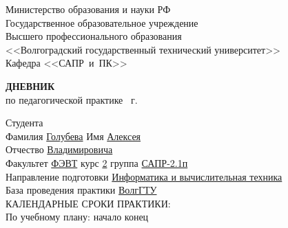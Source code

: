 \documentclass[a4paper, 14pt]{extreport}
\begin{document}
    \begin{titlepage}
        \begin{center}
            Министерство образования и науки РФ \\
            Государственное образовательное учреждение\\
            Высшего профессионального образования\\
            <<Волгоградский государственный технический университет>>\\
            Кафедра <<САПР~и~ПК>>
        \end{center}
        \vspace{2cm}
        \begin{center}
            \large \textbf{ДНЕВНИК} \\
            по педагогической практике \the\year\ г.
        \end{center}
        \begin{flushleft}
            Студента\\
            Фамилия \underline{Голубева\hspace{3.1cm}} 
            Имя \underline{Алексея\hspace{2.1cm}}\\
            Отчество \underline{Владимировича\hspace{1.6cm}}\\
            Факультет \underline{ФЭВТ\hspace{3.45cm}} курс \underline{2\hspace{1.5cm}} 
            группа \underline{САПР-2.1п\hspace{2.6cm}}\\
            \vspace{1cm}
            Направление подготовки \underline{Информатика и вычислительная техника\hspace{2.6cm}}\\
            \underline{\hspace{\textwidth}}
            База проведения практики \underline{ВолгГТУ\hspace{9.1cm}}\\
            \underline{\hspace{\textwidth}}\vspace{1cm}
            КАЛЕНДАРНЫЕ СРОКИ ПРАКТИКИ:\\
            По учебному плану: \hspace{0.2cm} начало \underline{\hspace{4.5cm}} 
            конец \underline{\hspace{4.5cm}}\\

\end{flushleft}
\end{titlepage}
\end{document}
